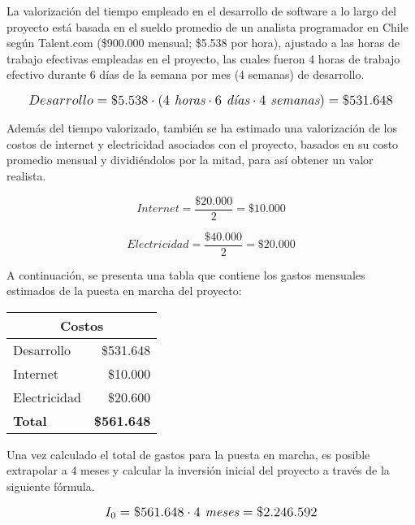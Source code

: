 La valorización del tiempo empleado en el desarrollo de software a lo largo del proyecto está basada en el sueldo promedio de un analista programador en Chile según Talent.com (\$900.000 mensual; \$5.538 por hora), ajustado a las horas de trabajo efectivas empleadas en el proyecto, las cuales fueron 4 horas de trabajo efectivo durante 6 días de la semana por mes (4 semanas) de desarrollo.

\[
\mathlarger{
	Desarrollo = \$5.538 \cdot \left(4 \textit{ horas}\cdot6 \textit{ días}\cdot4 \textit{ semanas}\right) = \$531.648
}
\]

Además del tiempo valorizado, también se ha estimado una valorización de los costos de internet y electricidad asociados con el proyecto, basados en su costo promedio mensual y dividiéndolos por la mitad, para así obtener un valor realista.

\[
	Internet = \frac{\$20.000}{2} = \$10.000
\]

\[
	Electricidad = \frac{\$40.000}{2} = \$20.000
\]

A continuación, se presenta una tabla que contiene los gastos mensuales estimados de la puesta en marcha del proyecto:

\begin{center}
	\begin{tabular}{ | p{5cm} | p{5cm} | }
		\hline
    \multicolumn{2}{|c|}{\textbf{Costos}} \\
		\hline
		{Desarrollo} & \multicolumn{1}{|r|}{\$531.648} \\ \hline
		
		{Internet} & \multicolumn{1}{|r|}{\$10.000} \\ \hline
		
		{Electricidad} & \multicolumn{1}{|r|}{\$20.600} \\ \hline
    
    {\textbf{Total}} & \multicolumn{1}{|r|}{\textbf{\$561.648}} \\ \hline
	\end{tabular}

  \label{table:costs}
\end{center}

Una vez calculado el total de gastos para la puesta en marcha, es posible extrapolar a 4 meses y calcular la inversión inicial del proyecto a través de la siguiente fórmula.

\[
\mathlarger{
	{I_0} = \$561.648 \cdot 4\textit{ meses}= \$2.246.592
}
\]


